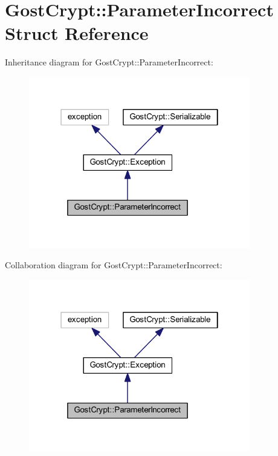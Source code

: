 \hypertarget{struct_gost_crypt_1_1_parameter_incorrect}{}\section{Gost\+Crypt\+:\+:Parameter\+Incorrect Struct Reference}
\label{struct_gost_crypt_1_1_parameter_incorrect}


Inheritance diagram for Gost\+Crypt\+:\+:Parameter\+Incorrect\+:
\nopagebreak
\begin{figure}[H]
\begin{center}
\leavevmode
\includegraphics[width=274pt]{struct_gost_crypt_1_1_parameter_incorrect__inherit__graph}
\end{center}
\end{figure}


Collaboration diagram for Gost\+Crypt\+:\+:Parameter\+Incorrect\+:
\nopagebreak
\begin{figure}[H]
\begin{center}
\leavevmode
\includegraphics[width=274pt]{struct_gost_crypt_1_1_parameter_incorrect__coll__graph}
\end{center}
\end{figure}
